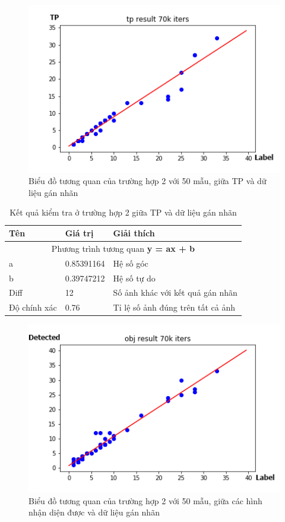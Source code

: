 \begin{center}
    \begin{figure}[H]
    \centering
    \includegraphics[width=0.9\columnwidth]{images/chap3/tp_70k.png}
    \caption{Biểu đồ tương quan của trường hợp 2 với 50 mẫu, giữa TP và dữ liệu gán nhãn}
    \label{fig:my_label}
    \end{figure}
\end{center}
\begin{table}[H]
    \begin{tabular}{p{4cm}  p{2.5cm}  p{5.5cm} }   
    \hline		
	Tên & Giá trị & Giải thích \\
	\hline
	\multicolumn{3}{c}{Phương trình tương quan \textbf{y = ax + b}} \\
	a & 0.85391164 & Hệ số góc \\
	b & 0.39747212 & Hệ số tự do \\
	\hline	
	Diff & 12 & Số ảnh khác với kết quả gán nhãn \\
	Độ chính xác & 0.76 &  Tỉ lệ số ảnh đúng trên tất cả ảnh\\
	\hline
	\end{tabular}
	\caption{Kết quả kiểm tra ở trường hợp 2 giữa TP và dữ liệu gán nhãn}
    \label{chap3:case2:table02}    
\end{table}
\begin{center}
    \begin{figure}[H]
    \centering
    \includegraphics[width=0.9\columnwidth]{images/chap3/all_70k.png}
    \caption{Biểu đồ tương quan của trường hợp 2 với 50 mẫu, giữa các hình nhận diện được và dữ liệu gán nhãn}
    \label{fig:my_label}
    \end{figure}
\end{center}
